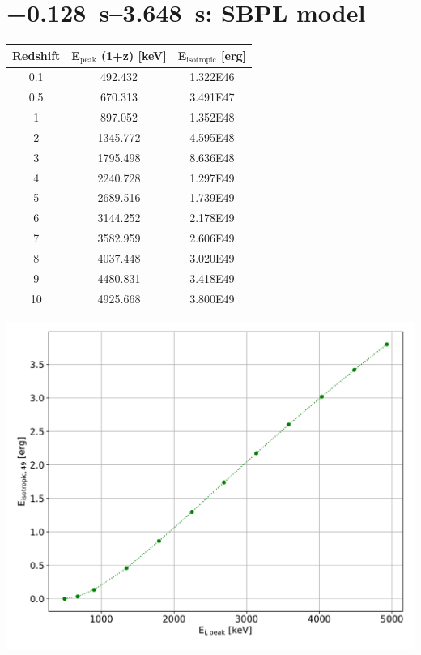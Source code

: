 \documentclass[10pt,report]{article}
\begin{document}
	\section{\SIrange{-0.128}{3.648}{\second}: SBPL model}
	\begin{minipage}[l]{0.48\textwidth}
		\centering
		\begin{tabular}{ccc}
			\toprule
			Redshift & E$_\text{peak}$ (1+z) [keV]& E$_\text{isotropic}$ [erg] \\
			\midrule
			0.1 & 492.432 & \num{1.322E46}\\
			0.5 & 670.313 & \num{3.491E47}\\
			1 & 897.052 & \num{1.352E48}\\
			2 & 1345.772 & \num{4.595E48}\\
			3 & 1795.498 & \num{8.636E48}\\
			4 & 2240.728 & \num{1.297E49}\\
			5 & 2689.516 & \num{1.739E49}\\
			6 & 3144.252 & \num{2.178E49}\\
			7 & 3582.959 & \num{2.606E49}\\
			8 & 4037.448 & \num{3.020E49}\\
			9 & 4480.831 & \num{3.418E49}\\
			10 & 4925.668 & \num{3.800E49}\\
			\bottomrule
		\end{tabular}
	\end{minipage}
	\hfill
	\begin{minipage}[r]{0.48\textwidth}
		\centering
		\includegraphics[width=\textwidth]{../ep1/Ep1__eipeak_eisotropic}
	\end{minipage}%
\end{document}
